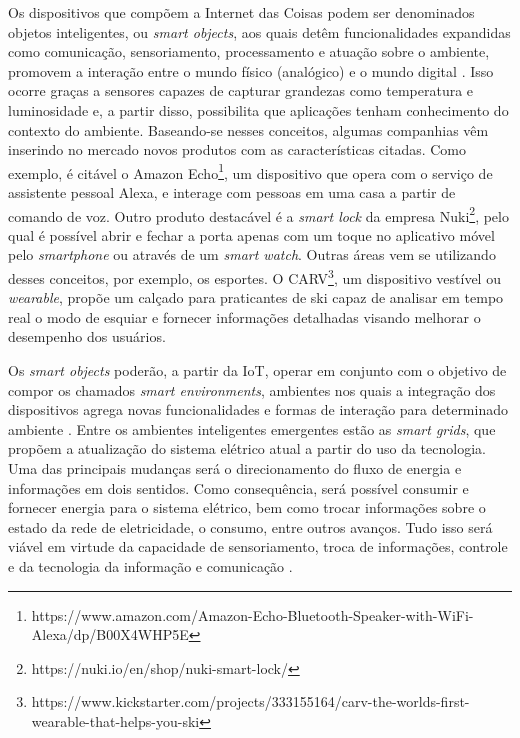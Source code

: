Os dispositivos que compõem a Internet das Coisas podem ser denominados objetos inteligentes, ou \textit{smart objects}, aos quais detêm funcionalidades expandidas como comunicação, sensoriamento, processamento e atuação sobre o ambiente, promovem a interação entre o mundo físico (analógico) e o mundo digital \cite{Stojkoska2017}. Isso ocorre graças a sensores capazes de capturar grandezas como temperatura e luminosidade e, a partir disso, possibilita que aplicações tenham conhecimento do contexto do ambiente. Baseando-se nesses conceitos, algumas companhias vêm inserindo no mercado novos produtos com as características citadas. Como exemplo, é citável o Amazon Echo\textsuperscript{\textregistered}\footnote{https://www.amazon.com/Amazon-Echo-Bluetooth-Speaker-with-WiFi-Alexa/dp/B00X4WHP5E}, um dispositivo que opera com o serviço de assistente pessoal Alexa, e interage com pessoas em uma casa a partir de comando de voz. Outro produto destacável é a \textit{smart lock} da empresa Nuki\textsuperscript{\textregistered}\footnote{https://nuki.io/en/shop/nuki-smart-lock/}, pelo qual é possível abrir e fechar a porta apenas com um toque no aplicativo móvel pelo \textit{smartphone} ou através de um \textit{smart watch}. Outras áreas vem se utilizando desses conceitos, por exemplo, os esportes. O CARV\textsuperscript{\textregistered}\footnote{https://www.kickstarter.com/projects/333155164/carv-the-worlds-first-wearable-that-helps-you-ski}, um dispositivo vestível ou \textit{wearable}, propõe um calçado para praticantes de ski capaz de analisar em tempo real o modo de esquiar e fornecer informações detalhadas visando melhorar o desempenho dos usuários.

Os \textit{smart objects} poderão, a partir da IoT, operar em conjunto com o objetivo de compor os chamados \textit{smart environments}, ambientes nos quais a integração dos dispositivos agrega novas funcionalidades e formas de interação para determinado ambiente \cite{Asano2016}. Entre os ambientes inteligentes emergentes estão as \textit{smart grids}, que propõem a atualização do sistema elétrico atual a partir do uso da tecnologia. Uma das principais mudanças será o direcionamento do fluxo de energia e informações em dois sentidos. Como consequência, será possível consumir e fornecer energia para o sistema elétrico, bem como trocar informações sobre o estado da rede de eletricidade, o consumo, entre outros avanços. Tudo isso será viável em virtude da capacidade de sensoriamento, troca de informações, controle e da tecnologia da informação e comunicação \cite{Cecilia2016}.  

